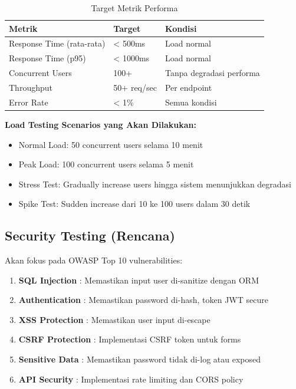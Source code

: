 \begin{table}[htbp]
\centering
\caption{Target Metrik Performa}
\label{tab:performance}
\begin{tabularx}{\textwidth}{|l|X|X|}
\hline
\textbf{Metrik} & \textbf{Target} & \textbf{Kondisi} \\
\hline
Response Time (rata-rata) & < 500ms & Load normal \\
\hline
Response Time (p95) & < 1000ms & Load normal \\
\hline
Concurrent Users & 100+ & Tanpa degradasi performa \\
\hline
Throughput & 50+ req/sec & Per endpoint \\
\hline
Error Rate & < 1\% & Semua kondisi \\
\hline
\end{tabularx}
\end{table}

\textbf{Load Testing Scenarios yang Akan Dilakukan:}
\begin{itemize}[leftmargin=*]
    \item Normal Load: 50 concurrent users selama 10 menit
    \item Peak Load: 100 concurrent users selama 5 menit
    \item Stress Test: Gradually increase users hingga sistem menunjukkan degradasi
    \item Spike Test: Sudden increase dari 10 ke 100 users dalam 30 detik
\end{itemize}

\subsection{Security Testing (Rencana)}

Akan fokus pada OWASP Top 10 vulnerabilities:

\begin{enumerate}[leftmargin=*]
    \item \textbf{SQL Injection} : Memastikan input user di-sanitize dengan ORM
    \item \textbf{Authentication} : Memastikan password di-hash, token JWT secure
    \item \textbf{XSS Protection} : Memastikan user input di-escape
    \item \textbf{CSRF Protection} : Implementasi CSRF token untuk forms
    \item \textbf{Sensitive Data} : Memastikan password tidak di-log atau exposed
    \item \textbf{API Security} : Implementasi rate limiting dan CORS policy
\end{enumerate}


